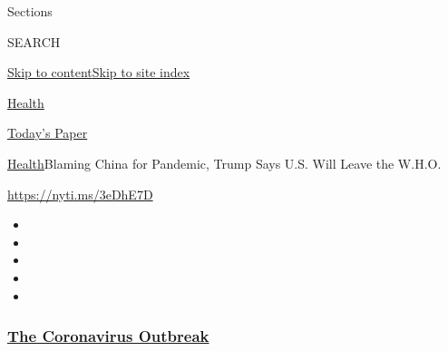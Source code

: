 Sections

SEARCH

\protect\hyperlink{site-content}{Skip to
content}\protect\hyperlink{site-index}{Skip to site index}

\href{https://www.nytimes3xbfgragh.onion/section/health}{Health}

\href{https://myaccount.nytimes3xbfgragh.onion/auth/login?response_type=cookie\&client_id=vi}{}

\href{https://www.nytimes3xbfgragh.onion/section/todayspaper}{Today's
Paper}

\href{/section/health}{Health}\textbar{}Blaming China for Pandemic,
Trump Says U.S. Will Leave the W.H.O.

\url{https://nyti.ms/3eDhE7D}

\begin{itemize}
\item
\item
\item
\item
\item
\end{itemize}

\hypertarget{the-coronavirus-outbreak}{%
\subsubsection{\texorpdfstring{\href{https://www.nytimes3xbfgragh.onion/news-event/coronavirus?name=styln-coronavirus-national\&region=TOP_BANNER\&variant=undefined\&block=storyline_menu_recirc\&action=click\&pgtype=Article\&impression_id=90041c20-e387-11ea-ab24-c151c34c6c9f}{The
Coronavirus
Outbreak}}{The Coronavirus Outbreak}}\label{the-coronavirus-outbreak}}

